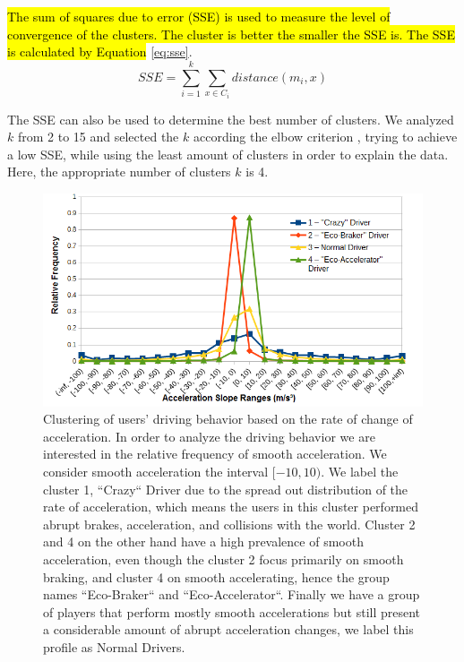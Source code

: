 \documentclass[preprint,authoryear,12pt]{elsarticle}
\newcommand{\hlc}[2][yellow]{ {\sethlcolor{#1} \hl{#2}} }
\begin{document}
\hlc[green]{
The sum of squares due to error (SSE) is used to measure the level of convergence of the clusters. The cluster is better the smaller the SSE is. The SSE is calculated by Equation
}
 \ref{eq:sse}.
\begin{equation}\label{eq:sse}
SSE = \sum\limits_{i=1}^{k} \sum\limits_{x \in C_{i}}distance(m_{i},x)
\end{equation}

The SSE can also be used to determine the best number of clusters. We analyzed $k$ from 2 to 15 and selected the $k$ according the elbow criterion \cite{Thorndike.1953}, trying to achieve a low SSE, while using the least amount of clusters in order to explain the data. Here, the appropriate number of clusters $k$ is 4. 

\begin{figure}[htb]
	\begin{center}
		\includegraphics[width=1\linewidth]{ijhcs14-img/kmeansclustering}
		\caption{Clustering of users' driving behavior based on the rate of change of acceleration. In order to analyze the driving behavior we are interested in the relative frequency of smooth acceleration. We consider smooth acceleration the interval $[-10,10)$. We label the cluster 1, ``Crazy`` Driver due to the spread out distribution of the rate of acceleration, which means the users in this cluster performed abrupt brakes, acceleration, and collisions with the world.
			Cluster 2 and 4 on the other hand have a high prevalence of smooth acceleration, even though the cluster 2 focus primarily on smooth braking, and cluster 4 on smooth accelerating, hence the group names ``Eco-Braker`` and ``Eco-Accelerator``. Finally we have a group of players that perform mostly smooth accelerations but still present a considerable amount of abrupt acceleration changes, we label this profile as Normal Drivers. \label{fig:accel-ranges}}
	\end{center}
\end{figure}
\end{document}
